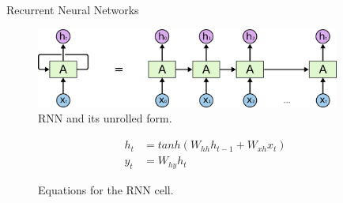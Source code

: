 \documentclass[aspectratio=169, 11pt]{beamer}
\begin{document}
\begin{frame}{Recurrent Neural Networks}
  \begin{figure}[!ht]
    \centering
    \includegraphics[width=100mm]{diagrams/rnn-unrolled.png}
    \caption{RNN and its unrolled form.} 
  \end{figure}
  \begin{figure}[!ht]
    \begin{equation}
    \label{eq:rnn}
    \begin{aligned}
      h_t &= tanh(W_{hh}h_{t-1}+W_{xh}x_t)
    \\
    y_t &= W_{hy}h_t
    \end{aligned}
    \end{equation}
    \caption{Equations for the RNN cell.}
  \end{figure}    
\end{frame}


\end{document}
